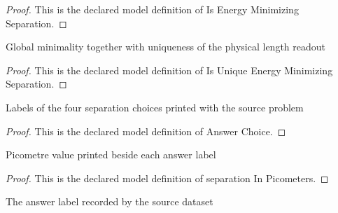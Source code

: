 \begin{proof}
  This is the declared model definition of Is Energy Minimizing Separation.
\end{proof}
\begin{definition}
  \label{def:physics:phyx-mini-0535:phyxminiproblems-problemphyxmini0535-isuniqueenergyminimizingseparation}
  Global minimality together with uniqueness of the physical length readout
\end{definition}
\begin{proof}
  This is the declared model definition of Is Unique Energy Minimizing Separation.
\end{proof}
\begin{definition}
  \label{def:physics:phyx-mini-0535:phyxminiproblems-problemphyxmini0535-answerchoice}
  Labels of the four separation choices printed with the source problem
\end{definition}
\begin{proof}
  This is the declared model definition of Answer Choice.
\end{proof}
\begin{definition}
  \label{def:physics:phyx-mini-0535:phyxminiproblems-problemphyxmini0535-answerchoice-separationinpicometers}
  Picometre value printed beside each answer label
\end{definition}
\begin{proof}
  This is the declared model definition of separation In Picometers.
\end{proof}
\begin{definition}
  \label{def:physics:phyx-mini-0535:phyxminiproblems-problemphyxmini0535-recordeddatasetanswer}
  The answer label recorded by the source dataset
\end{definition}
